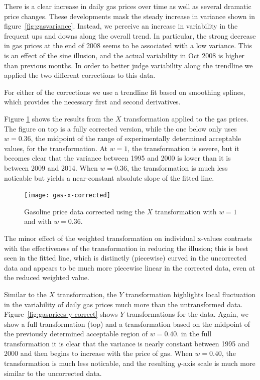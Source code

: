 \documentclass[11pt]{isuthesis}\usepackage[]{graphicx}\usepackage[]{color}
\begin{document}
There is a clear increase in daily gas prices over time as well as several dramatic price changes. These developments mask the steady increase in variance shown in figure~\ref{fig:gasvariance}. Instead, we perceive an increase in variability in the frequent ups and downs along the overall trend. In particular, the strong decrease in gas prices at the end of 2008 seems to be associated with a low variance. This is an effect of the sine illusion, and the actual variability in Oct 2008 is higher than previous months. In order to better judge variability along the trendline we applied the two different corrections to this data. 

For either of the corrections we use a trendline fit based on smoothing splines, which provides the necessary first and second derivatives.




Figure \ref{fig:gasprices-x-correct} shows the results from the $X$ transformation applied to the gas prices. The figure on top is a fully corrected version, while the one below only uses $w=0.36$, the midpoint of the range of experimentally determined acceptable values,  for the transformation. At $w=1$, the transformation is severe, but it becomes clear that the variance between 1995 and 2000 is lower than it is between 2009 and 2014. When $w=0.36$, the transformation is much less noticable but yields a near-constant absolute slope of the fitted line.

\begin{figure}
\centering
\texttt{[image: gas-x-corrected]}
\caption[Gasoline price data, X transformation]{Gasoline price data corrected using the $X$ transformation with $w=1$ and with $w=0.36$. }
\label{fig:gasprices-x-correct}
\end{figure}
The minor effect of the weighted transformation on individual x-values contrasts with the effectiveness of the transformation in reducing the illusion; this is best seen in the fitted line, which is distinctly (piecewise) curved in the uncorrected data and appears to be much more piecewise linear in the corrected data, even at the reduced weighted value. 

Similar to the $X$ transformation, the $Y$ transformation highlights local fluctuation in the variability of daily gas prices much more than the untransformed data. Figure~\ref{fig:gasprices-y-correct} shows $Y$ transformations for the data. Again, we show a full transformation (top) and a transformation based on the midpoint of the previously determined acceptable region of $w=0.40$.
in the full transformation  it is clear that the variance is nearly constant between 1995 and 2000 and then begins to increase with the price of gas. When $w=0.40$, the transformation is much less noticable, and the resulting $y$-axis scale is much more similar to the uncorrected data. 
\end{document}
